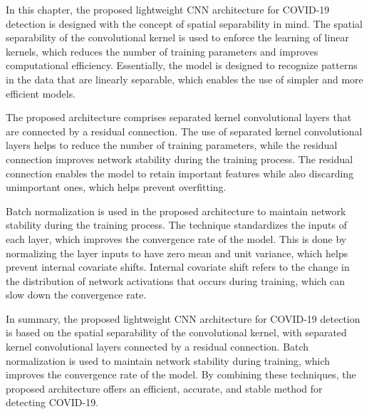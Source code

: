 In this chapter, the proposed lightweight CNN architecture for COVID-19 detection is designed with the concept of spatial separability in mind. The spatial separability of the convolutional kernel is used to enforce the learning of linear kernels, which reduces the number of training parameters and improves computational efficiency. Essentially, the model is designed to recognize patterns in the data that are linearly separable, which enables the use of simpler and more efficient models.

The proposed architecture comprises separated kernel convolutional layers that are connected by a residual connection. The use of separated kernel convolutional layers helps to reduce the number of training parameters, while the residual connection improves network stability during the training process. The residual connection enables the model to retain important features while also discarding unimportant ones, which helps prevent overfitting.

Batch normalization is used in the proposed architecture to maintain network stability during the training process. The technique standardizes the inputs of each layer, which improves the convergence rate of the model. This is done by normalizing the layer inputs to have zero mean and unit variance, which helps prevent internal covariate shifts. Internal covariate shift refers to the change in the distribution of network activations that occurs during training, which can slow down the convergence rate.

In summary, the proposed lightweight CNN architecture for COVID-19 detection is based on the spatial separability of the convolutional kernel, with separated kernel convolutional layers connected by a residual connection. Batch normalization is used to maintain network stability during training, which improves the convergence rate of the model. By combining these techniques, the proposed architecture offers an efficient, accurate, and stable method for detecting COVID-19.